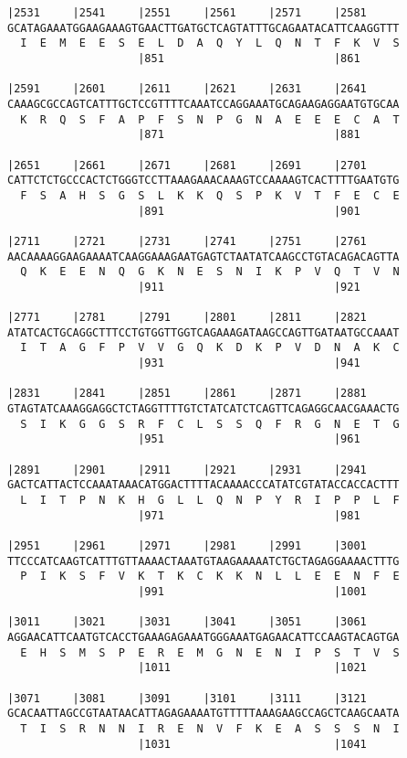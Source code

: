 \documentclass{article}
\begin{document}
\begin{Verbatim}
|2531     |2541     |2551     |2561     |2571     |2581     
GCATAGAAATGGAAGAAAGTGAACTTGATGCTCAGTATTTGCAGAATACATTCAAGGTTT
  I  E  M  E  E  S  E  L  D  A  Q  Y  L  Q  N  T  F  K  V  S
                    |851                          |861      
  
|2591     |2601     |2611     |2621     |2631     |2641     
CAAAGCGCCAGTCATTTGCTCCGTTTTCAAATCCAGGAAATGCAGAAGAGGAATGTGCAA
  K  R  Q  S  F  A  P  F  S  N  P  G  N  A  E  E  E  C  A  T
                    |871                          |881      
  
|2651     |2661     |2671     |2681     |2691     |2701     
CATTCTCTGCCCACTCTGGGTCCTTAAAGAAACAAAGTCCAAAAGTCACTTTTGAATGTG
  F  S  A  H  S  G  S  L  K  K  Q  S  P  K  V  T  F  E  C  E
                    |891                          |901      
  
|2711     |2721     |2731     |2741     |2751     |2761     
AACAAAAGGAAGAAAATCAAGGAAAGAATGAGTCTAATATCAAGCCTGTACAGACAGTTA
  Q  K  E  E  N  Q  G  K  N  E  S  N  I  K  P  V  Q  T  V  N
                    |911                          |921      
  
|2771     |2781     |2791     |2801     |2811     |2821     
ATATCACTGCAGGCTTTCCTGTGGTTGGTCAGAAAGATAAGCCAGTTGATAATGCCAAAT
  I  T  A  G  F  P  V  V  G  Q  K  D  K  P  V  D  N  A  K  C
                    |931                          |941      
  
|2831     |2841     |2851     |2861     |2871     |2881     
GTAGTATCAAAGGAGGCTCTAGGTTTTGTCTATCATCTCAGTTCAGAGGCAACGAAACTG
  S  I  K  G  G  S  R  F  C  L  S  S  Q  F  R  G  N  E  T  G
                    |951                          |961      
  
|2891     |2901     |2911     |2921     |2931     |2941     
GACTCATTACTCCAAATAAACATGGACTTTTACAAAACCCATATCGTATACCACCACTTT
  L  I  T  P  N  K  H  G  L  L  Q  N  P  Y  R  I  P  P  L  F
                    |971                          |981      
  
|2951     |2961     |2971     |2981     |2991     |3001     
TTCCCATCAAGTCATTTGTTAAAACTAAATGTAAGAAAAATCTGCTAGAGGAAAACTTTG
  P  I  K  S  F  V  K  T  K  C  K  K  N  L  L  E  E  N  F  E
                    |991                          |1001     
  
|3011     |3021     |3031     |3041     |3051     |3061     
AGGAACATTCAATGTCACCTGAAAGAGAAATGGGAAATGAGAACATTCCAAGTACAGTGA
  E  H  S  M  S  P  E  R  E  M  G  N  E  N  I  P  S  T  V  S
                    |1011                         |1021     
  
|3071     |3081     |3091     |3101     |3111     |3121     
GCACAATTAGCCGTAATAACATTAGAGAAAATGTTTTTAAAGAAGCCAGCTCAAGCAATA
  T  I  S  R  N  N  I  R  E  N  V  F  K  E  A  S  S  S  N  I
                    |1031                         |1041     
  

\end{Verbatim}
\end{document}
